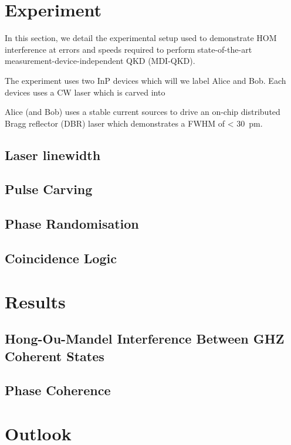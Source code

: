 \section{Experiment}

In this section, we detail the experimental setup used to demonstrate HOM interference at errors and speeds required to perform state-of-the-art measurement-device-independent QKD (MDI-QKD).

The experiment uses two InP devices which will we label Alice and Bob. Each devices uses a CW laser which is carved into  

Alice (and Bob) uses a stable current sources to drive an on-chip distributed Bragg reflector (DBR) laser which demonstrates a FWHM of < \SI{30}{\pico\metre}.

\subsection{Laser linewidth}

\subsection{Pulse Carving}

\subsection{Phase Randomisation}

\subsection{Coincidence Logic}

\section{Results}

\subsection{Hong-Ou-Mandel Interference Between GHZ Coherent States}

\subsection{Phase Coherence}

\section{Outlook}

